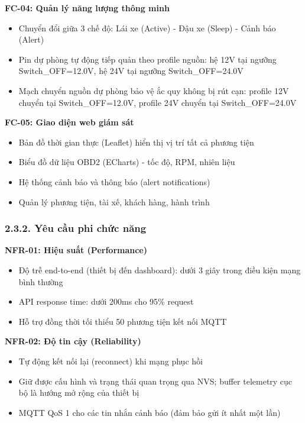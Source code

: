 \documentclass[13pt,a4paper]{extarticle}
\renewcommand{\\}{\thesislongtableorignewline\hline}%
\providecommand{\tightlist}{%
  \setlength{\itemsep}{0pt}\setlength{\parskip}{0pt}}
\begin{document}
\textbf{FC-04: Quản lý năng lượng thông minh}

\begin{itemize}
\tightlist
\item
  Chuyển đổi giữa 3 chế độ: Lái xe (Active) - Đậu xe (Sleep) - Cảnh báo
  (Alert)
\item
  Pin dự phòng tự động tiếp quản theo profile nguồn: hệ 12V tại ngưỡng
  Switch\_OFF=12.0V, hệ 24V tại ngưỡng Switch\_OFF=24.0V
\item
  Mạch chuyển nguồn dự phòng bảo vệ ắc quy không bị rút cạn: profile 12V
  chuyển tại Switch\_OFF=12.0V, profile 24V chuyển tại Switch\_OFF=24.0V
\end{itemize}

\textbf{FC-05: Giao diện web giám sát}

\begin{itemize}
\tightlist
\item
  Bản đồ thời gian thực (Leaflet) hiển thị vị trí tất cả phương tiện
\item
  Biểu đồ dữ liệu OBD2 (ECharts) - tốc độ, RPM, nhiên liệu
\item
  Hệ thống cảnh báo và thông báo (alert notifications)
\item
  Quản lý phương tiện, tài xế, khách hàng, hành trình
\end{itemize}

\subsubsection{2.3.2. Yêu cầu phi chức
năng}\label{232-yuxeau-cux1ea7u-phi-chux1ee9c-nux103ng}

\textbf{NFR-01: Hiệu suất (Performance)}

\begin{itemize}
\tightlist
\item
  Độ trễ end-to-end (thiết bị đến dashboard): dưới 3 giây trong điều
  kiện mạng bình thường
\item
  API response time: dưới 200ms cho 95\% request
\item
  Hỗ trợ đồng thời tối thiểu 50 phương tiện kết nối MQTT
\end{itemize}

\textbf{NFR-02: Độ tin cậy (Reliability)}

\begin{itemize}
\tightlist
\item
  Tự động kết nối lại (reconnect) khi mạng phục hồi
\item
  Giữ được cấu hình và trạng thái quan trọng qua NVS; buffer telemetry
  cục bộ là hướng mở rộng của thiết bị
\item
  MQTT QoS 1 cho các tin nhắn cảnh báo (đảm bảo gửi ít nhất một lần)
\end{itemize}
\end{document}
